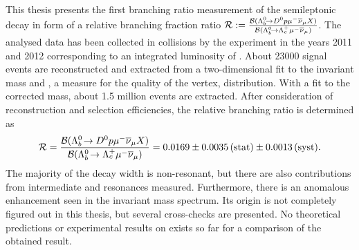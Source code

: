 This thesis presents the first branching ratio measurement of the semileptonic decay \LbToDpmunuX in form of a relative branching fraction ratio $\mathcal{R} := \frac{{\cal B}({{\Lambda}^0_{b}}\!\rightarrow {\ensuremath{{D}^0}}{\ensuremath{p}}{\ensuremath{\mu^-}}{\ensuremath{{\overline{\nu}}_\mu}} X)}{{\cal B}({{\Lambda}^0_{b}}\!\rightarrow {\ensuremath{{\Lambda}^+_{c}}}{\ensuremath{\mu^-}}{\ensuremath{{\overline{\nu}}_\mu}})}$.
The analysed data has been collected in \proton\proton collisions by the \lhcb experiment in the years 2011 and 2012 corresponding to an integrated luminosity of \intlum{3\invfb}.
About 23000 \LbToDpmunu signal events are reconstructed and extracted from a two-dimensional fit to the invariant \Dz\proton mass and \logIP, a measure for the quality of the  \Dz\proton\mun vertex, distribution.
With a fit to the corrected \Lb mass, about 1.5 million \LbToLcmunu events are extracted.
After consideration of reconstruction and selection efficiencies, the relative branching ratio \R is determined as
\begin{align*}
    \mathcal{R} = \frac{{\cal B}({{\Lambda}^0_{b}}\!\rightarrow {\ensuremath{{D}^0}}{\ensuremath{p}}{\ensuremath{\mu^-}}{\ensuremath{{\overline{\nu}}_\mu}} X)}{{\cal B}({{\Lambda}^0_{b}}\!\rightarrow {\ensuremath{{\Lambda}^+_{c}}}{\ensuremath{\mu^-}}{\ensuremath{{\overline{\nu}}_\mu}})} = 0.0169 \pm 0.0035\mathrm{\,(stat)} \pm 0.0013\mathrm{\,(syst)}.
\end{align*}
The majority of the \LbToDpmunuX decay width is non-resonant, but there are also contributions from intermediate \LcResI and \LcResII resonances measured.
Furthermore, there is an anomalous enhancement seen in the invariant \Dz\proton mass spectrum.
Its origin is not completely figured out in this thesis, but several cross-checks are presented.
No theoretical predictions or experimental results on \R exists so far for a comparison of the obtained result.
